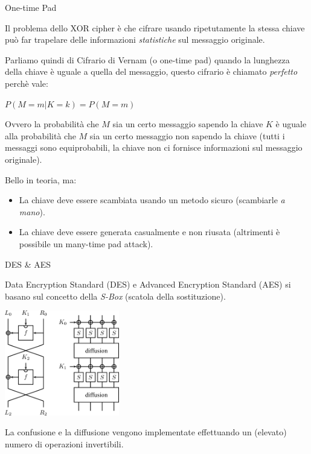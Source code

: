 \documentclass[xcolor=dvipsnames,aspectratio=169]{beamer}
\begin{document}
\begin{frame}{One-time Pad}
  
  \pause
  
  Il problema dello XOR cipher è che cifrare usando ripetutamente la stessa chiave può far trapelare delle informazioni \textit{statistiche} sul messaggio originale.
  
  \medskip
  
  \pause
  Parliamo quindi di Cifrario di Vernam (o one-time pad) quando la lunghezza della chiave è uguale a quella del messaggio, questo cifrario è chiamato \textit{perfetto} perchè vale:
  
  \medskip
  
  $P(M = m | K = k) = P(M = m)$
  
  \medskip
  
  Ovvero la probabilità che $M$ sia un certo messaggio sapendo la chiave $K$ è uguale alla probabilità che $M$ sia un certo messaggio non sapendo la chiave (tutti i messaggi sono equiprobabili, la chiave non ci fornisce informazioni sul messaggio originale).
  
  \medskip
  
  \pause

  Bello in teoria, ma:
  
  \begin{itemize}
    \item La chiave deve essere scambiata usando un metodo sicuro (scambiarle \textit{a mano}).
    \item La chiave deve essere generata casualmente e non riusata (altrimenti è possibile un many-time pad attack).
  \end{itemize}
  
\end{frame}

\begin{frame}{DES \& AES}
  
  Data Encryption Standard (DES) e Advanced Encryption Standard (AES) si basano sul concetto della \textit{S-Box} (scatola della sostituzione).

  \pause
  
  \medskip
  
  \centering\includegraphics[width=5cm]{img/des} 
  
  \medskip

  La confusione e la diffusione vengono implementate effettuando un (elevato) numero di operazioni invertibili.
  
\end{frame}
\end{document}
